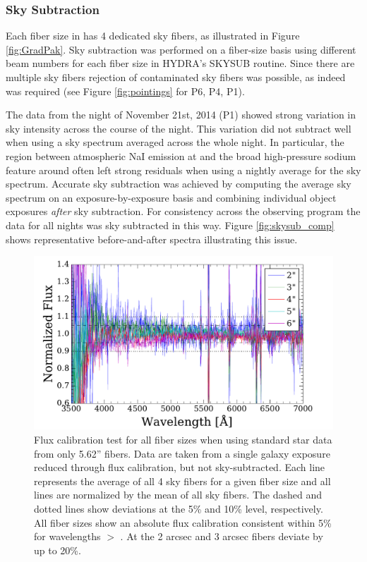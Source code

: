 \subsubsection{Sky Subtraction}
\label{891_1:sec:skysub}

Each fiber size in \GP has 4 dedicated sky fibers, as illustrated in
Figure \ref{fig:GradPak}.  Sky subtraction was performed on a
fiber-size basis using different beam numbers for each fiber size in
HYDRA's SKYSUB routine.  Since there are multiple sky fibers rejection
of contaminated sky fibers was possible, as indeed was required (see
Figure \ref{fig:pointings} for P6, P4, P1).

The data from the night of November 21st, 2014 (P1) showed strong
variation in sky intensity across the course of the night. This
variation did not subtract well when using a sky spectrum averaged
across the whole night. In particular, the region between atmospheric
NaI emission at  and the broad high-pressure sodium
feature around  often left strong residuals when using
a nightly average for the sky spectrum. Accurate sky subtraction was
achieved by computing the average sky spectrum on an
exposure-by-exposure basis and combining individual object exposures
\emph{after} sky subtraction. For consistency across the observing
program the data for all nights was sky subtracted in this way. Figure
\ref{fig:skysub_comp} shows representative before-and-after spectra
illustrating this issue.

\begin{figure}
  \centering
  \includegraphics[width=\columnwidth]{891_1/figs/flux_cal_test.pdf}
  \caption{\label{fig:sky_flux_comp}\fixspacing Flux calibration test
    for all fiber sizes when using standard star data from only 5.62''
    fibers. Data are taken from a single galaxy exposure reduced
    through flux calibration, but not sky-subtracted. Each line
    represents the average of all 4 sky fibers for a given fiber size
    and all lines are normalized by the mean of all sky fibers. The
    dashed and dotted lines show deviations at the 5\% and 10\% level,
    respectively. All fiber sizes show an absolute flux calibration
    consistent within 5\% for wavelengths $>$ . At
     the 2 arcsec and 3 arcsec fibers deviate by up to
    20\%.}
\end{figure}

